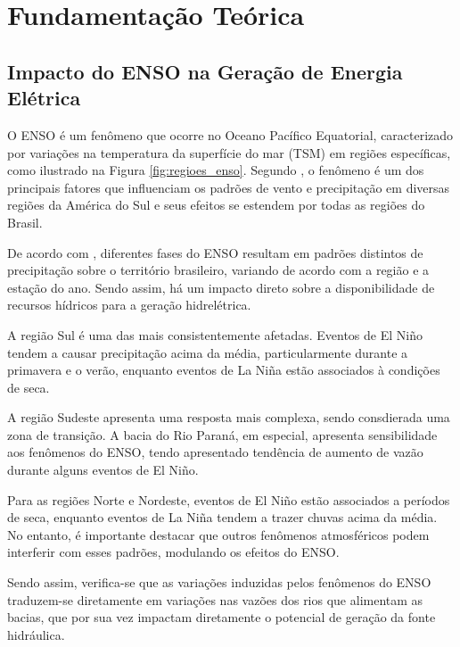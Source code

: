 
\chapter{Fundamentação Teórica}
\section{Impacto do ENSO na Geração de Energia Elétrica}
O ENSO é um fenômeno que ocorre no Oceano Pacífico Equatorial, caracterizado por variações na temperatura da superfície
do mar (TSM) em regiões específicas, como ilustrado na Figura \ref{fig:regioes_enso}. Segundo , o 
fenômeno é um dos principais fatores que influenciam os padrões de vento e precipitação em diversas regiões da América 
do Sul e seus efeitos se estendem por todas as regiões do Brasil.

De acordo com , diferentes fases do ENSO resultam em padrões distintos de precipitação sobre
o território brasileiro, variando de acordo com a região e a estação do ano. Sendo assim, há um impacto direto sobre a 
disponibilidade de recursos hídricos para a geração hidrelétrica.

A região Sul é uma das mais consistentemente afetadas. Eventos de El Niño tendem a causar precipitação acima da média,
particularmente durante a primavera e o verão, enquanto eventos de La Niña estão associados à condições de seca.

A região Sudeste apresenta uma resposta mais complexa, sendo consdierada uma zona de transição. A bacia do Rio Paraná,
em especial, apresenta sensibilidade aos fenômenos do ENSO, tendo apresentado tendência de aumento de vazão durante alguns
eventos de El Niño.

Para as regiões Norte e Nordeste, eventos de El Niño estão associados a períodos de seca, enquanto eventos de
La Niña tendem a trazer chuvas acima da média. No entanto, é importante destacar que outros fenômenos atmosféricos podem
interferir com esses padrões, modulando os efeitos do ENSO.

Sendo assim, verifica-se que as variações induzidas pelos fenômenos do ENSO traduzem-se diretamente em variações nas
vazões dos rios que alimentam as bacias, que por sua vez impactam diretamente o potencial de geração da fonte hidráulica.

